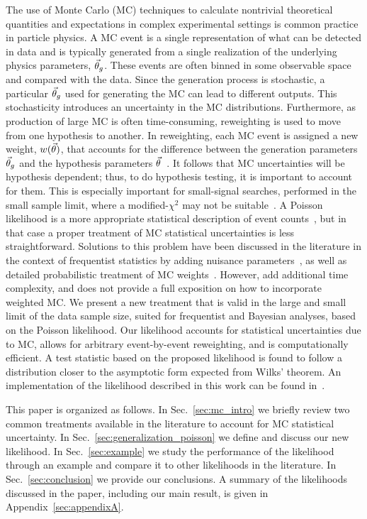 The use of Monte Carlo (MC) techniques to calculate nontrivial theoretical quantities and expectations in complex experimental settings is common practice in particle physics.
A MC event is a single representation of what can be detected in data and is typically generated from a single realization of the underlying physics parameters, $\vec{\theta}_g$. These events are often binned in some observable space and compared with the data. Since the generation process is stochastic, a particular $\vec{\theta}_g$ used for generating the MC can lead to different outputs. This stochasticity introduces an uncertainty in the MC distributions. Furthermore, as production of large MC is often time-consuming, reweighting is used to move from one hypothesis to another. In reweighting, each MC event is assigned a new weight, $w(\vec{\theta})$, that accounts for the difference between the generation parameters $\vec{\theta}_g$ and the hypothesis parameters $\vec{\theta}$~\cite{Gainer:2014bta}. It follows that MC uncertainties will be hypothesis dependent; thus, to do hypothesis testing, it is important to account for them. This is especially important for small-signal searches, performed in the small sample limit, where a modified-$\chi^2$ may not be suitable~\cite{Lyons:1986em}. A Poisson likelihood is a more appropriate statistical description of event counts~\cite{poisson1837recherches}, but in that case a proper treatment of MC statistical uncertainties is less straightforward. Solutions to this problem have been discussed in the literature in the context of frequentist statistics by adding nuisance parameters~\cite{Barlow:1993dm,Cranmer:2012sba,Chirkin:2013lya}, as well as detailed probabilistic treatment of MC weights~\cite{Glusenkamp:2017rlp}. However, \cite{Barlow:1993dm, Chirkin:2013lya, Glusenkamp:2017rlp} add additional time complexity, and \cite{Cranmer:2012sba} does not provide a full exposition on how to incorporate weighted MC. We present a new treatment that is valid in the large and small limit of the data sample size, suited for frequentist and Bayesian analyses, based on the Poisson likelihood. Our likelihood accounts for statistical uncertainties due to MC, allows for arbitrary event-by-event reweighting, and is computationally efficient. A test statistic based on the proposed likelihood is found to follow a distribution closer to the asymptotic form expected from Wilks' theorem. An implementation of the likelihood described in this work can be found in~\cite{MCLLH}.

This paper is organized as follows. In Sec.~\ref{sec:mc_intro} we briefly review two common treatments available in the literature to account for MC statistical uncertainty. In Sec.~\ref{sec:generalization_poisson} we define and discuss our new likelihood. In Sec.~\ref{sec:example} we study the performance of the likelihood through an example and compare it to other likelihoods in the literature. In Sec.~\ref{sec:conclusion} we provide our conclusions. A summary of the likelihoods discussed in the paper, including our main result, is given in Appendix~\ref{sec:appendixA}.

